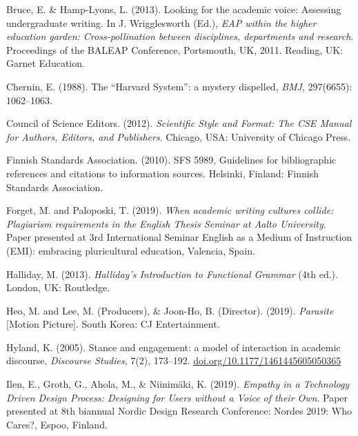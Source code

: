 \documentclass[finnish, 12pt, a4paper, arts, utf8, a-2b, online]{aaltothesis}
\begin{document}
\vspace{1ex}
\noindent
Bruce, E. \& Hamp-Lyons, L. (2013). 
Looking for the academic voice: Assessing undergraduate writing. 
In J. Wrigglesworth (Ed.), 
\textit{EAP within the higher education garden: Cross-pollination between 
	disciplines, departments and research}. 
Proceedings of the BALEAP Conference, Portsmouth, UK, 2011. Reading, UK: Garnet
Education.

\vspace{1ex}
\noindent
Chernin, E. (1988). 
The “Harvard System”: a mystery dispelled, \textit{BMJ}, 297(6655): 1062--1063.

\vspace{1ex}
\noindent
Council of Science Editors. (2012). 
\textit{Scientific Style and Format: The CSE Manual for Authors, Editors, and
	Publishers}. 
Chicago, USA: University of Chicago Press.

\vspace{1ex}
\noindent
Finnish Standards Association. (2010). SFS 5989, Guidelines for bibliographic 
references and citations to information sources. Helsinki, Finland: Finnish 
Standards Association.

\vspace{1ex}
\noindent
Forget, M. and Paloposki, T. (2019). 
\textit{When academic writing cultures collide: Plagiarism requirements in the 
	English Thesis Seminar at Aalto University}. 
Paper presented at 3rd International Seminar English as a Medium of Instruction 
(EMI): embracing pluricultural education, Valencia, Spain.

\vspace{1ex}
\noindent
Halliday, M. (2013). \textit{Halliday’s Introduction to Functional Grammar} 
(4th ed.). London, UK: Routledge.

\vspace{1ex}
\noindent
Heo, M. and Lee, M. (Producers), \& Joon-Ho, B. (Director). (2019). 
\textit{Parasite} [Motion Picture]. South Korea: CJ Entertainment.

\vspace{1ex}
\noindent
Hyland, K. (2005). 
Stance and engagement: a model of interaction in academic discourse, 
\textit{Discourse Studies}, 7(2), 173--192. 
\url{doi.org/10.1177/1461445605050365}

\vspace{1ex}
\noindent
Ilen, E., Groth, G., Ahola, M., \& Niinimäki, K. (2019). 
\textit{Empathy in a Technology Driven Design Process: Designing for Users 
	without a Voice of their Own}. 
Paper presented at 8th biannual Nordic Design Research Conference: Nordes 2019: 
Who Cares?, Espoo, Finland.
\end{document}
